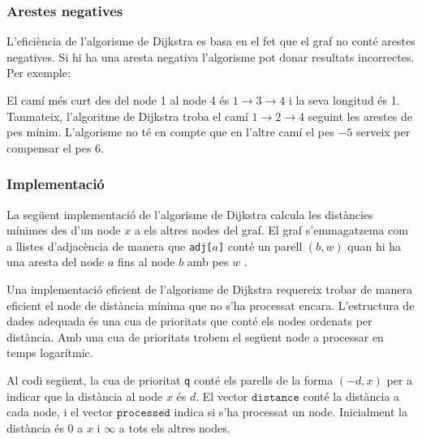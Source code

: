 \subsubsection{Arestes negatives}

L'eficiència de l'algorisme de Dijkstra es basa en el fet que el graf
no conté arestes negatives. Si hi ha una aresta negativa l'algorisme
pot donar resultats incorrectes. Per exemple:


\begin{center}
\end{center}
\noindent El camí més curt des del node 1 al node 4 és $1 \rightarrow
3 \rightarrow 4$ i la seva longitud és 1. Tanmateix, l'algoritme de
Dijkstra troba el camí $1 \rightarrow 2 \rightarrow 4$ seguint les
arestes de pes mínim. L'algorisme no té en compte que en l'altre camí
el pes $-5$ serveix per compensar el pes $6$.

\subsubsection{Implementació}

La següent implementació de l'algorisme de Dijkstra calcula les
distàncies mínimes des d'un node $x$ a els altres nodes del graf. El graf
s'emmagatzema com a llistes d'adjacència de manera que
\texttt{adj[$a$]} conté un parell $(b,w)$ quan hi ha una
aresta del node $a$ fins al node $b$ amb pes $w$ .

Una implementació eficient de l'algorisme de Dijkstra requereix trobar
de manera eficient el node de distància mínima que no s'ha processat
encara. L'estructura de dades adequada és una cua de prioritats que
conté els nodes ordenats per distància. Amb una cua de prioritats
trobem el següent node a processar en temps logarítmic.

Al codi següent, la cua de prioritat \texttt{q} conté els parells de
la forma $(-d,x)$ per a indicar que la distància al node $x$ és
$d$. El vector $\texttt{distance}$ conté la distància a cada node, i
el vector $\texttt{processed}$ indica si s'ha processat un
node. Inicialment la distància és $0$ a $x$ i $\infty$ a tots els
altres nodes.


